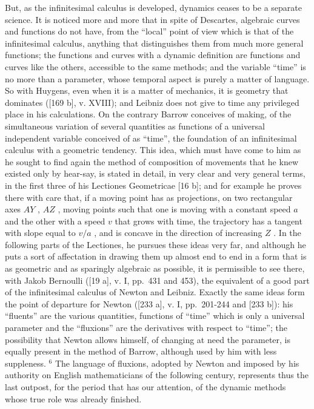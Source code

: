 But, as the infinitesimal calculus is developed, dynamics ceases to be a separate science. It is noticed more and more that in spite of Descartes, algebraic curves and functions do not have, from the ``local'' point of view which is that of the infinitesimal calculus, anything that distinguishes them from much more general functions; the functions and curves with a dynamic definition are functions and curves like the others, accessible to the same methods; and the variable ``time'' is no more than a parameter, whose temporal aspect is purely a matter of language. So with Huygens, even when it is a matter of mechanics, it is geometry that dominates ({[}169 b{]}, v. XVIII); and Leibniz does not give to time any privileged place in his calculations. On the contrary Barrow conceives of making, of the simultaneous variation of several quantities as functions of a universal independent variable conceived of as ``time'', the foundation of an infinitesimal calculus with a geometric tendency. This idea, which must have come to him as he sought to find again the method of composition of movements that he knew existed only by hear-say, is stated in detail, in very clear and very general terms, in the first three of his Lectiones Geometricae {[}16 b{]}; and for example he proves there with care that, if a moving point has as projections, on two rectangular axes \(AY\) , \(AZ\) , moving points such that one is moving with a constant speed \(a\) and the other with a speed \(v\) that grows with time, the trajectory has a tangent with slope equal to \(v/a\) , and is concave in the direction of increasing \(Z\) . In the following parts of the Lectiones, he pursues these ideas very far, and although he puts a sort of affectation in drawing them up almost end to end in a form that is as geometric and as sparingly algebraic as possible, it is permissible to see there, with Jakob Bernoulli ({[}19 a{]}, v. I, pp.~431 and 453), the equivalent of a good part of the infinitesimal calculus of Newton and Leibniz. Exactly the same ideas form the point of departure for Newton ({[}233 a{]}, v. I, pp.~201-244 and {[}233 b{]}): his ``fluents'' are the various quantities, functions of ``time'' which is only a universal parameter and the ``fluxions'' are the derivatives with respect to ``time''; the possibility that Newton allows himself, of changing at need the parameter, is equally present in the method of Barrow, although used by him with less suppleness. \(^{6}\) The language of fluxions, adopted by Newton and imposed by his authority on English mathematicians of the following century, represents thus the last outpost, for the period that has our attention, of the dynamic methods whose true role was already finished.

